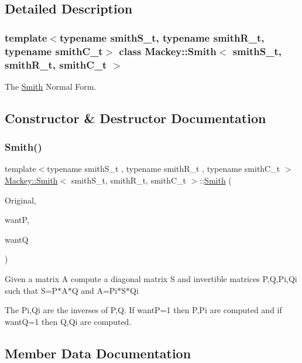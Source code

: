 \subsection{Detailed Description}
\subsubsection*{template$<$typename smith\+S\+\_\+t, typename smith\+R\+\_\+t, typename smith\+C\+\_\+t$>$\newline
class Mackey\+::\+Smith$<$ smith\+S\+\_\+t, smith\+R\+\_\+t, smith\+C\+\_\+t $>$}

The \hyperlink{classMackey_1_1Smith}{Smith} Normal Form. 

\subsection{Constructor \& Destructor Documentation}
\mbox{\label{classMackey_1_1Smith_a43f657bfa335acf5fe10dd864326c0aa}} 
\subsubsection{\texorpdfstring{Smith()}{Smith()}}
{\footnotesize\ttfamily template$<$typename smith\+S\+\_\+t , typename smith\+R\+\_\+t , typename smith\+C\+\_\+t $>$ \\
\hyperlink{classMackey_1_1Smith}{Mackey\+::\+Smith}$<$ smith\+S\+\_\+t, smith\+R\+\_\+t, smith\+C\+\_\+t $>$\+::\hyperlink{classMackey_1_1Smith}{Smith} (\begin{DoxyParamCaption}\item[{const smith\+S\+\_\+t \&}]{Original,  }\item[{const bool \&}]{wantP,  }\item[{const bool \&}]{wantQ }\end{DoxyParamCaption})}

Given a matrix A compute a diagonal matrix S and invertible matrices P,Q,Pi,Qi such that S=P$\ast$\+A$\ast$Q and A=Pi$\ast$\+S$\ast$\+Qi

The Pi,Qi are the inverses of P,Q. If wantP=1 then P,Pi are computed and if wantQ=1 then Q,Qi are computed. 

\subsection{Member Data Documentation}
\mbox{\label{classMackey_1_1Smith_a02ea735836a4a70f504e360495b0e1e1}} 
